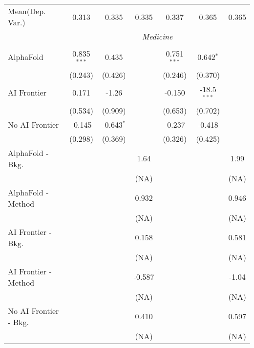 \begin{tabular}{lcccccc}
Mean(Dep. Var.) & 0.313 & 0.335 & 0.335 & 0.337 & 0.365 & 0.365 \\
 & \multicolumn{6}{c}{\textit{Medicine}} \\ \\
   AlphaFold               & 0.835$^{***}$ & 0.435        &        & 0.751$^{***}$ & 0.642$^{*}$   &   \\   
                           & (0.243)       & (0.426)      &        & (0.246)       & (0.370)       &   \\   
   AI Frontier             & 0.171         & -1.26        &        & -0.150        & -18.5$^{***}$ &   \\   
                           & (0.534)       & (0.909)      &        & (0.653)       & (0.702)       &   \\   
   No AI Frontier          & -0.145        & -0.643$^{*}$ &        & -0.237        & -0.418        &   \\   
                           & (0.298)       & (0.369)      &        & (0.326)       & (0.425)       &   \\   
   AlphaFold - Bkg.        &               &              & 1.64   &               &               & 1.99\\   
                           &               &              & (NA)   &               &               & (NA)\\   
   AlphaFold - Method      &               &              & 0.932  &               &               & 0.946\\   
                           &               &              & (NA)   &               &               & (NA)\\   
   AI Frontier - Bkg.      &               &              & 0.158  &               &               & 0.581\\   
                           &               &              & (NA)   &               &               & (NA)\\   
   AI Frontier - Method    &               &              & -0.587 &               &               & -1.04\\   
                           &               &              & (NA)   &               &               & (NA)\\   
   No AI Frontier - Bkg.   &               &              & 0.410  &               &               & 0.597\\   
                           &               &              & (NA)   &               &               & (NA)\\   

\end{tabular}
